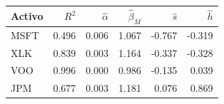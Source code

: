 \begin{tabular}{lrrrrr}
\hline
Activo & $R^2$ & $\hat\alpha$ & $\hat\beta_M$ & $\hat s$ & $\hat h$ \\
\hline
MSFT & 0.496 & 0.006 & 1.067 & -0.767 & -0.319 \\
XLK & 0.839 & 0.003 & 1.164 & -0.337 & -0.328 \\
VOO & 0.996 & 0.000 & 0.986 & -0.135 & 0.039 \\
JPM & 0.677 & 0.003 & 1.181 & 0.076 & 0.869 \\
\hline
\end{tabular}

